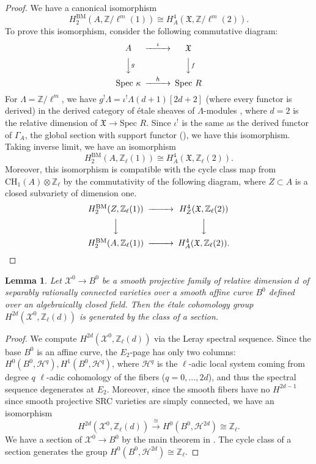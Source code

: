 \documentclass{amsart}
\newtheorem{lem}[theorem]{Lemma}
\theoremstyle{definition}
\theoremstyle{remark}
\newcommand{\mbb}{\mathbb}
\newcommand{\ZZ}{\mbb{Z}}
\newcommand{\mc}{\mathcal}
\newcommand{\mcX}{\mc{X}}
\newcommand{\SP}{\text{Spec }}
\begin{document}
\begin{proof}
We have a canonical isomorphism
\[
H_2^{\text{BM}}(A, \ZZ/\ell^m(1)) \cong H^{4}_A(\mathfrak{X}, \ZZ/\ell^m(2)).
\]
To prove this isomorphism, consider the following commutative diagram:
\[
\begin{CD}
    A @>\iota>> \mathfrak{X}\\
    @VVgV @VVfV\\
    \SP \kappa @>h>> \SP R
\end{CD}
\]
For $\Lambda=\ZZ/\ell^m$, 
 we have $g^!\Lambda=\iota^!\Lambda(d+1)[2d+2]$ (where every functor is derived) in the derived category of \'etale sheaves of $\Lambda$-modules \cite[(2.6)]{WittenbergEsnault_0_cycle}, where $d=2$ is the relative dimension of $\mathfrak{X} \to \SP R$. Since $\iota^!$ is the same as the derived functor of $\Gamma_{A}$, the global section with support functor (\cite[XVIII 3.1.8]{SGA4_3}), we have this isomorphism.
 Taking inverse limit, we have an isomorphism
 \[
H_2^{\text{BM}}(A, \ZZ_\ell(1)) \cong H^{4}_{A}(\mathfrak{X}, \ZZ_\ell(2)).
\]
Moreover, this isomorphism is compatible with the cycle class map from $\text{CH}_1(A)\otimes \ZZ_\ell$ by the commutativity of the following diagram, where $Z\subset A$ is a closed subvariety of dimension one.
\[
\begin{CD}
    H_2^{\text{BM}}(Z, \ZZ_\ell(1)) @>>> H^{4}_{Z}(\mathfrak{X}, \ZZ_\ell(2))\\
    @VVV @VVV\\
    H_2^{\text{BM}}(A, \ZZ_\ell(1)) @>>> H^{4}_{A}(\mathfrak{X}, \ZZ_\ell(2)).
\end{CD}
\]
\end{proof}
\begin{lem}\label{lem:H2d}
    Let $\mcX^0 \to B^0$ be a smooth projective family of relative dimension $d$ of separably rationally connected varieties over a smooth \emph{affine} curve $B^0$ defined over an algebraically closed field.
    Then the \'etale cohomology group $H^{2d}(\mcX^0, \ZZ_\ell(d))$ is generated by the class of a section.
\end{lem}
\begin{proof}
    We compute $H^{2d}({\mcX}^0, \ZZ_\ell(d))$ via the Leray spectral sequence.
Since the base $B^0$ is an affine curve, the $E_2$-page has only two columns: $H^0(B^0, \mathcal{H}^q), H^1(B^0, \mathcal{H}^{q})$, where $\mathcal{H}^q$ is the $\ell$-adic local system coming from degree $q$ $\ell$-adic cohomology of the fibers ($q=0, \ldots, 2d$), and thus the spectral sequence degenerates at $E_2$.
Moreover, since the smooth fibers have no $H^{2d-1}$ since smooth projective SRC varieties are simply connected, we have an isomorphism
\[
H^{2d}({\mcX}^0, \ZZ_\ell(d))\xrightarrow{\cong}H^0(B^0,\mathcal{H}^{2d})\cong \ZZ_\ell.
\]
We have a section of ${\mcX}^0 \to {B}^0$ by the main theorem in \cite{deJongStarr_GHS}.
The cycle class of a section generates the group $H^0(B^0,\mathcal{H}^{2d})\cong \ZZ_\ell$.
\end{proof}
\end{document}
